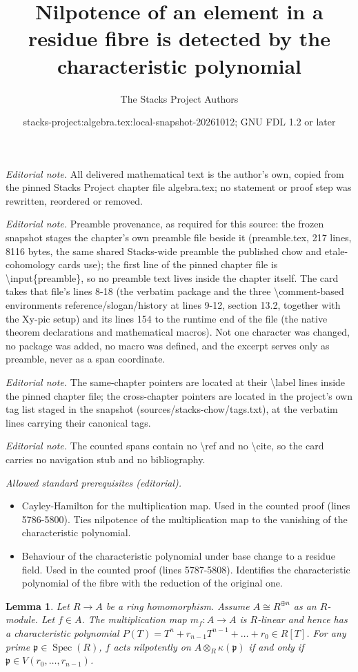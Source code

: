 \documentclass[10pt,a4paper]{amsart}
\title{Nilpotence of an element in a residue fibre is detected by the characteristic polynomial}
\author{The Stacks Project Authors}
\date{stacks-project:algebra.tex:local-snapshot-20261012; GNU FDL 1.2 or later}
\theoremstyle{plain}
\newtheorem{lemma}[subsection]{Lemma}
\theoremstyle{definition}
\theoremstyle{remark}
\numberwithin{equation}{subsection}
\def\Spec{\mathop{\mathrm{Spec}}}
\begin{document}
\maketitle
\noindent\textit{Editorial note.} All delivered mathematical text is the author's own, copied from the pinned Stacks Project chapter file algebra.tex; no statement or proof step was rewritten, reordered or removed.\par\medskip
\noindent\textit{Editorial note.} Preamble provenance, as required for this source: the frozen snapshot stages the chapter's own preamble file beside it (preamble.tex, 217 lines, 8116 bytes, the same shared Stacks-wide preamble the published chow and etale-cohomology cards use); the first line of the pinned chapter file is \textbackslash{}input\{preamble\}, so no preamble text lives inside the chapter itself. The card takes that file's lines 8-18 (the verbatim package and the three \textbackslash{}comment-based environments reference/slogan/history at lines 9-12, section 13.2, together with the Xy-pic setup) and its lines 154 to the runtime end of the file (the native theorem declarations and mathematical macros). Not one character was changed, no package was added, no macro was defined, and the excerpt serves only as preamble, never as a span coordinate.\par\medskip
\noindent\textit{Editorial note.} The same-chapter pointers are located at their \textbackslash{}label lines inside the pinned chapter file; the cross-chapter pointers are located in the project's own tag list staged in the snapshot (sources/stacks-chow/tags.txt), at the verbatim lines carrying their canonical tags.\par\medskip
\noindent\textit{Editorial note.} The counted spans contain no \textbackslash{}ref and no \textbackslash{}cite, so the card carries no navigation stub and no bibliography.\par\medskip
\noindent\textit{Allowed standard prerequisites (editorial).}\begin{itemize}
\item Cayley-Hamilton for the multiplication map. Used in the counted proof (lines 5786-5800). Ties nilpotence of the multiplication map to the vanishing of the characteristic polynomial.
\item Behaviour of the characteristic polynomial under base change to a residue field. Used in the counted proof (lines 5787-5808). Identifies the characteristic polynomial of the fibre with the reduction of the original one.
\end{itemize}\medskip
\begin{lemma}
\label{lemma-characteristic-polynomial-prime}
Let $R \to A$ be a ring homomorphism.
Assume $A \cong R^{\oplus n}$ as an $R$-module.
Let $f \in A$. The multiplication map $m_f: A
\to A$ is $R$-linear and hence
has a characteristic polynomial
$P(T) = T^n + r_{n-1}T^{n-1} + \ldots + r_0 \in R[T]$.
For any prime
$\mathfrak{p} \in \Spec(R)$, $f$ acts nilpotently on $A
\otimes_R \kappa(\mathfrak{p})$ if and only if $\mathfrak p \in
V(r_0, \ldots, r_{n-1})$.
\end{lemma}
\end{document}
